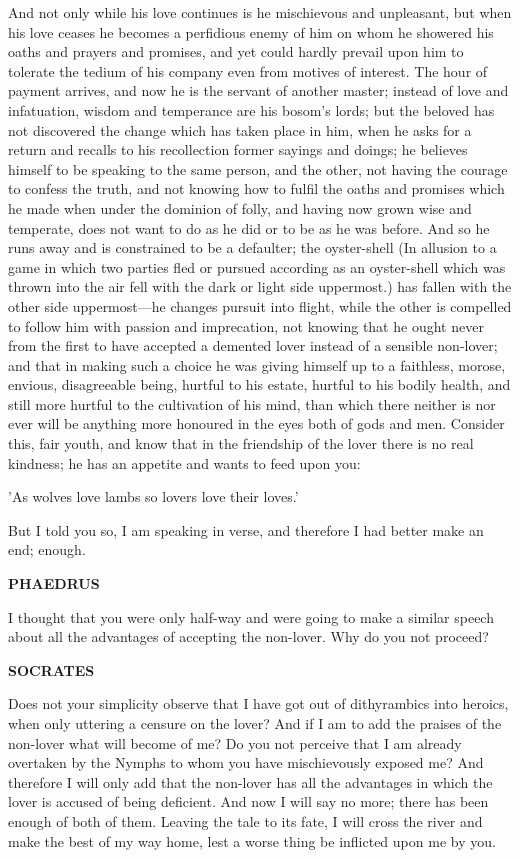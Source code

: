 \documentclass[11pt,letter]{article}
\begin{document}
\par  And not only while his love continues is he mischievous and unpleasant, but when his love ceases he becomes a perfidious enemy of him on whom he showered his oaths and prayers and promises, and yet could hardly prevail upon him to tolerate the tedium of his company even from motives of interest. The hour of payment arrives, and now he is the servant of another master; instead of love and infatuation, wisdom and temperance are his bosom's lords; but the beloved has not discovered the change which has taken place in him, when he asks for a return and recalls to his recollection former sayings and doings; he believes himself to be speaking to the same person, and the other, not having the courage to confess the truth, and not knowing how to fulfil the oaths and promises which he made when under the dominion of folly, and having now grown wise and temperate, does not want to do as he did or to be as he was before. And so he runs away and is constrained to be a defaulter; the oyster-shell (In allusion to a game in which two parties fled or pursued according as an oyster-shell which was thrown into the air fell with the dark or light side uppermost.) has fallen with the other side uppermost—he changes pursuit into flight, while the other is compelled to follow him with passion and imprecation, not knowing that he ought never from the first to have accepted a demented lover instead of a sensible non-lover; and that in making such a choice he was giving himself up to a faithless, morose, envious, disagreeable being, hurtful to his estate, hurtful to his bodily health, and still more hurtful to the cultivation of his mind, than which there neither is nor ever will be anything more honoured in the eyes both of gods and men. Consider this, fair youth, and know that in the friendship of the lover there is no real kindness; he has an appetite and wants to feed upon you:

\par  'As wolves love lambs so lovers love their loves.'

\par  But I told you so, I am speaking in verse, and therefore I had better make an end; enough.

\par \textbf{PHAEDRUS}
\par   I thought that you were only half-way and were going to make a similar speech about all the advantages of accepting the non-lover. Why do you not proceed?

\par \textbf{SOCRATES}
\par   Does not your simplicity observe that I have got out of dithyrambics into heroics, when only uttering a censure on the lover? And if I am to add the praises of the non-lover what will become of me? Do you not perceive that I am already overtaken by the Nymphs to whom you have mischievously exposed me? And therefore I will only add that the non-lover has all the advantages in which the lover is accused of being deficient. And now I will say no more; there has been enough of both of them. Leaving the tale to its fate, I will cross the river and make the best of my way home, lest a worse thing be inflicted upon me by you.
\end{document}
